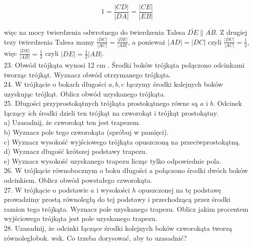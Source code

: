 \documentclass[10pt]{article}
\begin{document}
\[
1=\frac{|C D|}{|D A|}=\frac{|C E|}{|E B|}
\]

więc na mocy twierdzenia odwrotnego do twierdzenia Talesa \(\overline{D E} \| \overline{A B}\). Z drugiej tezy twierdzenia Talesa mamy \(\frac{|D C|}{|A C|}=\frac{|D E|}{|A B|}\), a ponieważ \(|A D|=|D C|\) czyli \(\frac{|D C|}{|A C|}=\frac{1}{2}\), więc \(\frac{|D E|}{|A B|}=\frac{1}{2}\) czyli \(|D E|=\frac{1}{2}|A B|\).\\
23. Obwód trójkąta wynosi 12 cm . Środki boków trójkąta połączono odcinkami tworząc trójkąt. Wyznacz obwód otrzymanego trójkąta.\\
24. W trójkącie o bokach długości \(a, b, c\) łączymy środki kolejnych boków uzyskując trójkąt. Oblicz obwód uzyskanego trójkąta.\\
25. Długości przyprostokątnych trójkąta prostokątnego równe są \(a\) i \(b\). Odcinek łączący ich środki dzieli ten trójkąt na czworokąt i trójkąt prostokątny.\\
a) Uzasadnij, że czworokąt ten jest trapezem.\\
b) Wyznacz pole tego czworokąta (spróbuj w pamięci).\\
c) Wyznacz wysokość wyjściowego trójkąta opuszczoną na przeciwprostokątną.\\
d) Wyznacz długość krótszej podstawy trapezu.\\
e) Wyznacz wysokość uzyskanego trapezu licząc tylko odpowiednie pola.\\
26. W trójkącie równobocznym o boku długości a połączono środki dwóch boków odcinkiem. Oblicz obwód powstałego czworokąta.\\
27. W trójkącie o podstawie \(a\) i wysokości \(h\) opuszczonej na tę podstawę prowadzimy prostą równoległą do tej podstawy i przechodzącą przez środki ramion tego trójkąta. Wyznacz pole uzyskanego trapezu. Oblicz jakim procentem wyjściowego trójkąta jest pole uzyskanego trapezu.\\
28. Uzasadnij, że odcinki łączące środki kolejnych boków czworokąta tworzą równoległobok. wsk. Co trzeba dorysować, aby to uzasadnić?\\
\end{document}
